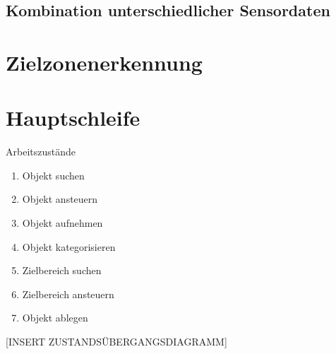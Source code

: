 \subsection{Kombination unterschiedlicher Sensordaten}


\section{Zielzonenerkennung}


\section{Hauptschleife}

Arbeitszustände
\begin{enumerate}
\item{Objekt suchen}
\item{Objekt ansteuern}
\item{Objekt aufnehmen}
\item{Objekt kategorisieren}
\item{Zielbereich suchen}
\item{Zielbereich ansteuern}
\item{Objekt ablegen}
\end{enumerate}

[INSERT ZUSTANDSÜBERGANGSDIAGRAMM]

